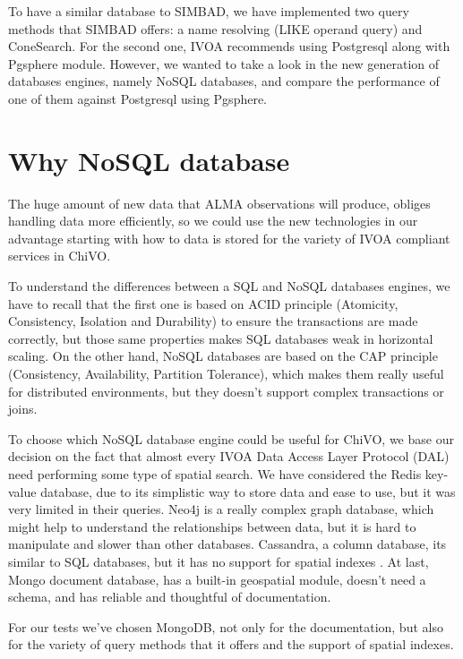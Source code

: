\documentclass[11pt,twoside]{article}
\begin{document}
To have a similar database to SIMBAD, we have implemented two query methods that
SIMBAD offers: a name resolving (LIKE operand query) and ConeSearch. For the second one, 
IVOA recommends using Postgresql along with Pgsphere module. 
However, we wanted to take a look in the new generation of databases engines, namely NoSQL databases, and compare the
performance of one of them against Postgresql using Pgsphere.


\section{Why NoSQL database}
    The huge amount of new data that ALMA observations will produce, obliges
    handling data more efficiently, so we could use the new technologies 
    in our advantage starting with how to data is stored for the variety
    of IVOA compliant services in ChiVO.
    
    To understand the differences between a SQL and NoSQL databases engines, we have
    to recall that the first one is based on ACID principle 
    (Atomicity, Consistency, Isolation and Durability) to ensure the
    transactions are made correctly, but those same properties
    makes SQL databases weak in horizontal scaling. On the other hand, NoSQL
    databases are based on the CAP principle (Consistency, Availability, Partition
    Tolerance), which makes them really useful for distributed environments, but 
    they doesn't support complex transactions or joins.

    To choose which NoSQL database engine could be useful for ChiVO, we base our
    decision on the fact that almost every
    IVOA Data Access Layer Protocol (DAL) need performing some type of spatial
    search. We have considered the Redis key-value database, due to its
    simplistic way to store data and ease to use, but it was very limited in
    their queries. Neo4j is a really complex graph database, which might help to
    understand the relationships between data, but it is hard to manipulate and slower 
    than other databases. Cassandra, a column database, its similar
    to SQL databases, but it has no support for spatial indexes
    . At last, Mongo document database, 
    has a built-in geospatial module, doesn't need a schema, and has reliable
    and thoughtful of documentation.

    For our tests we've chosen MongoDB, not only for the documentation, but also
    for the variety of query methods that it offers and the support of spatial indexes.
\end{document}
